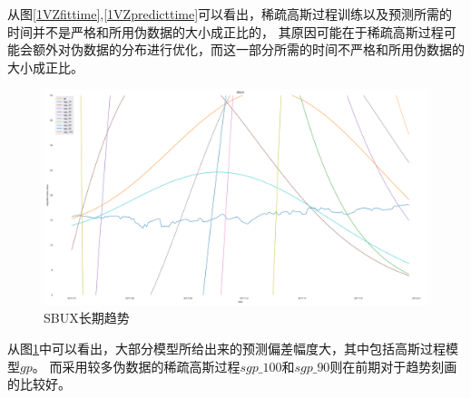 从图\ref{1VZfittime},\ref{1VZpredicttime}可以看出，稀疏高斯过程训练以及预测所需的时间并不是严格和所用伪数据的大小成正比的，
其原因可能在于稀疏高斯过程可能会额外对伪数据的分布进行优化，而这一部分所需的时间不严格和所用伪数据的大小成正比。


\begin{figure}[!htbp]
    \centering
    \includegraphics[width=\textwidth]{images/lab1/SBUX_trend.png}
    \caption{SBUX长期趋势}\label{1lab1SBUXtrend}
\end{figure}

从图\ref{1lab1SBUXtrend}中可以看出，大部分模型所给出来的预测偏差幅度大，其中包括高斯过程模型$gp$。
而采用较多伪数据的稀疏高斯过程$sgp\_100$和$sgp\_90$则在前期对于趋势刻画的比较好。

